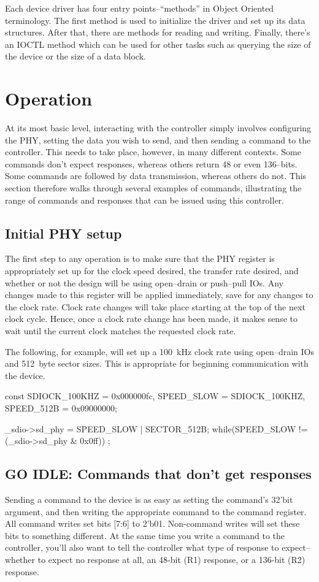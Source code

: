 \documentclass{gqtekspec}
\begin{document}
Each device driver has four entry points--``methods'' in Object Oriented
terminology.  The first method is used to initialize the driver and set up
its data structures.  After that, there are methods for reading and writing.
Finally, there's an IOCTL method which can be used for other tasks such as
querying the size of the device or the size of a data block.

\chapter{Operation}\label{ch:ops}
At its most basic level, interacting with the controller simply involves
configuring the PHY, setting the data you wish to send, and then sending a
command to the controller.  This needs to take place, however, in many
different contexts.  Some commands don't expect responses, whereas others
return 48 or even 136--bits.  Some commands are followed by data transmission,
whereas others do not.  This section therefore walks through several
examples of commands, illustrating the range of commands and responses
that can be issued using this controller.

\section{Initial PHY setup}
The first step to any operation is to make sure that the PHY register
is appropriately set up for the clock speed desired, the transfer rate
desired, and whether or not the design will be using open--drain or push--pull
IOs.  Any changes made to this register will be applied immediately, save
for any changes to the clock rate.  Clock rate changes will take place starting
at the top of the next clock cycle.  Hence, once a clock rate change has been
made, it makes sense to wait until the current clock matches the requested
clock rate.

The following, for example, will set up a 100~kHz clock rate using open--drain
IOs and 512~byte sector sizes.  This is appropriate for beginning communication
with the device.

\begin{zCpp}
	const	SDIOCK_100KHZ = 0x000000fc,
		SPEED_SLOW    = SDIOCK_100KHZ,
		SPEED_512B    = 0x09000000;

	_sdio->sd_phy = SPEED_SLOW | SECTOR_512B;
	while(SPEED_SLOW != (_sdio->sd_phy & 0x0ff))
		;
\end{zCpp}
\section{GO IDLE: Commands that don't get responses}
Sending a command to the device is as easy as setting the command's 32'bit
argument, and then writing the appropriate command to the command register.
All command writes set bits [7:6] to 2'b01.  Non-command writes will set these
bits to something different.  At the same time you write a command to the
controller, you'll also want to tell the controller what type of
response to expect--whether to expect no response at all, an 48-bit (R1)
response, or a 136-bit (R2) response.
\end{document}
